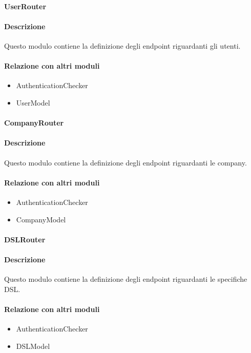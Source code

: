 \paragraph{UserRouter}
\paragraph*{Descrizione}
Questo modulo contiene la definizione degli endpoint riguardanti gli utenti. 

\paragraph*{Relazione con altri moduli}
\begin{itemize}
\item AuthenticationChecker
\item UserModel
\end{itemize}

\paragraph{CompanyRouter}
\paragraph*{Descrizione}
Questo modulo contiene la definizione degli endpoint riguardanti le company.

\paragraph*{Relazione con altri moduli}
\begin{itemize}
\item AuthenticationChecker
\item CompanyModel
\end{itemize}

\paragraph{DSLRouter}
\paragraph*{Descrizione}
Questo modulo contiene la definizione degli endpoint riguardanti le specifiche DSL.

\paragraph*{Relazione con altri moduli}
\begin{itemize}
\item AuthenticationChecker
\item DSLModel
\end{itemize}

